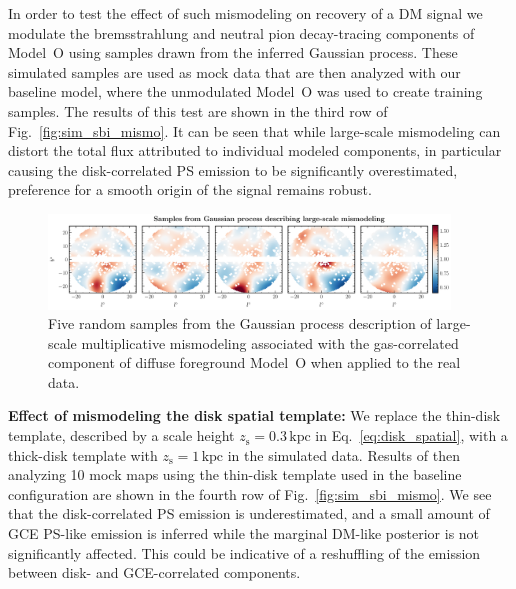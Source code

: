 \documentclass[prd,aps,10pt,nofootinbib,twocolumn,superscriptaddress,preprintnumbers,balancelastpage,longbibliography,floatfix]{revtex4-2}
\begin{document}
In order to test the effect of such mismodeling on recovery of a DM signal we modulate the bremsstrahlung and neutral pion decay-tracing components of {Model~O} using samples drawn from the inferred Gaussian process. These simulated samples are used as mock data that are then analyzed with our baseline model, where the unmodulated {Model~O} was used to create training samples.
The results of this test are shown in the third row of Fig.~\ref{fig:sim_sbi_mismo}. It can be seen that while large-scale mismodeling can distort the total flux attributed to individual modeled components, in particular causing the disk-correlated PS emission to be significantly overestimated, preference for a smooth origin of the signal remains robust. \\

%
\begin{figure}[t]
\centering
\includegraphics[width=0.95\textwidth]{plots/dd_mismo_map.pdf}
\caption{Five random samples from the Gaussian process description of large-scale multiplicative mismodeling associated with the gas-correlated component of diffuse foreground {Model~O} when applied to the real \Fermi data.}
\label{fig:dd_mismo_map}
\end{figure}
%

\noindent
\textbf{Effect of mismodeling the disk spatial template:} 
We replace the thin-disk template, described by a scale height $z_\mathrm{s} = 0.3\,\mathrm{kpc}$ in Eq.~\eqref{eq:disk_spatial}, with a thick-disk template with $z_\mathrm{s} = 1\,\mathrm{kpc}$ in the simulated data. Results of then analyzing 10 mock maps using the thin-disk template used in the baseline configuration are shown in the fourth row of Fig.~\ref{fig:sim_sbi_mismo}. We see that the disk-correlated PS emission is underestimated, and a small amount of GCE PS-like emission is inferred while the marginal DM-like posterior is not significantly affected. This could be indicative of a reshuffling of the emission between disk- and GCE-correlated components. \\
\end{document}
